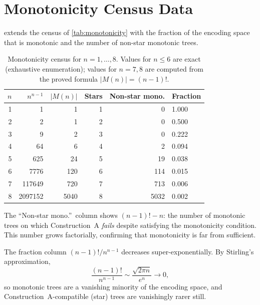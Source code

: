 \documentclass[aps,pra,twocolumn,superscriptaddress,showpacs]{revtex4-2}
\theoremstyle{definition}
\begin{document}
\section{Monotonicity Census Data}
\label{app:monotonicity-census}

 extends the census of
\cref{tab:monotonicity} with the fraction of the encoding space
that is monotonic and the number of non-star monotonic trees.

\begin{table}[h]
\centering
\caption{Monotonicity census for $n = 1, \ldots, 8$.  Values for
$n \le 6$ are exact (exhaustive enumeration); values for $n = 7, 8$
are computed from the proved formula $|M(n)| = (n{-}1)!$.}
\label{tab:census-full}
\begin{tabular}{@{}rrrrrl@{}}
\toprule
$n$ & $n^{n-1}$ & $|M(n)|$ & Stars & Non-star mono. & Fraction \\
\midrule
1 &           1 &       1 &  1 &       0 & 1.000 \\
2 &           2 &       1 &  2 &       0 & 0.500 \\
3 &           9 &       2 &  3 &       0 & 0.222 \\
4 &          64 &       6 &  4 &       2 & 0.094 \\
5 &         625 &      24 &  5 &      19 & 0.038 \\
6 &       7776 &     120 &  6 &     114 & 0.015 \\
7 &     117649 &     720 &  7 &     713 & 0.006 \\
8 &   2097152 &    5040 &  8 &    5032 & 0.002 \\
\bottomrule
\end{tabular}
\end{table}

The ``Non-star mono.''\ column shows $(n{-}1)! - n$: the number of
monotonic trees on which Construction~A \emph{fails} despite
satisfying the monotonicity condition.  This number grows factorially,
confirming that monotonicity is far from sufficient.

The fraction column $(n{-}1)!/n^{n-1}$ decreases super-exponentially.
By Stirling's approximation,
\begin{equation*}
  \frac{(n{-}1)!}{n^{n-1}}
  \sim \frac{\sqrt{2\pi n}}{e^n} \to 0,
\end{equation*}
so monotonic trees are a vanishing minority of the encoding space,
and Construction~A-compatible (star) trees are vanishingly rarer
still.
\end{document}

